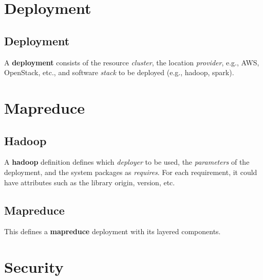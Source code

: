 \documentclass[9pt,twocolumn,twoside]{styles/osajnl}
\begin{document}

\section{Deployment}

\subsection{Deployment}

A \textbf{deployment} consists of the resource \- \textit{cluster},
the location \- \textit{provider}, e.g., AWS, OpenStack, etc., and
software \textit{stack} to be deployed (e.g., hadoop, spark).


\section{Mapreduce}

\subsection{Hadoop}

A \textbf{hadoop} definition defines which \textit{deployer} to be used,
the \textit{parameters} of the deployment, and the system packages as
\textit{requires}. For each requirement, it could have attributes such
as the library origin, version, etc.



\subsection{Mapreduce}

This defines a \textbf{mapreduce} deployment with its layered
components.


\section{Security}
\end{document}
